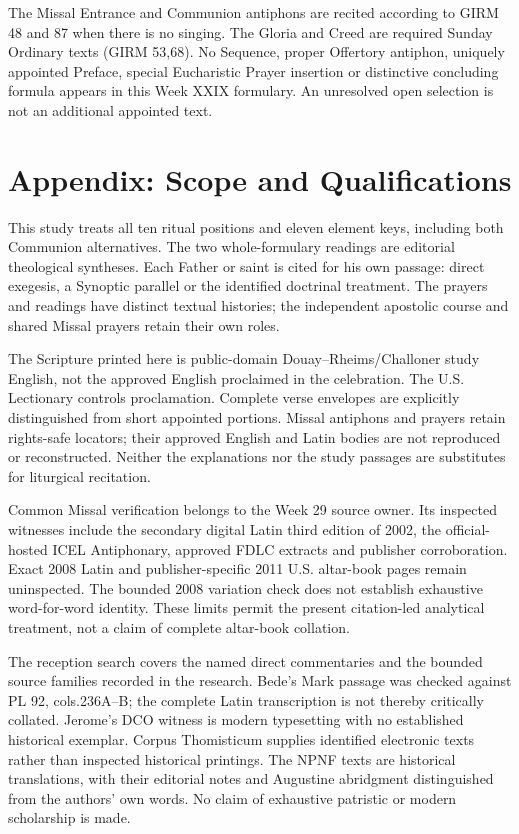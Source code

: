 The Missal Entrance and Communion antiphons are recited according to GIRM 48 and 87 when there is no singing. The Gloria and Creed are required Sunday Ordinary texts (GIRM 53,68). No Sequence, proper Offertory antiphon, uniquely appointed Preface, special Eucharistic Prayer insertion or distinctive concluding formula appears in this Week XXIX formulary. An unresolved open selection is not an additional appointed text.

\section{Appendix: Scope and Qualifications}
This study treats all ten ritual positions and eleven element keys, including both Communion alternatives. The two whole-formulary readings are editorial theological syntheses. Each Father or saint is cited for his own passage: direct exegesis, a Synoptic parallel or the identified doctrinal treatment. The prayers and readings have distinct textual histories; the independent apostolic course and shared Missal prayers retain their own roles.

The Scripture printed here is public-domain Douay--Rheims/Challoner study English, not the approved English proclaimed in the celebration. The U.S. Lectionary controls proclamation. Complete verse envelopes are explicitly distinguished from short appointed portions. Missal antiphons and prayers retain rights-safe locators; their approved English and Latin bodies are not reproduced or reconstructed. Neither the explanations nor the study passages are substitutes for liturgical recitation.

Common Missal verification belongs to the Week 29 source owner. Its inspected witnesses include the secondary digital Latin third edition of 2002, the official-hosted ICEL Antiphonary, approved FDLC extracts and publisher corroboration. Exact 2008 Latin and publisher-specific 2011 U.S. altar-book pages remain uninspected. The bounded 2008 variation check does not establish exhaustive word-for-word identity. These limits permit the present citation-led analytical treatment, not a claim of complete altar-book collation.

The reception search covers the named direct commentaries and the bounded source families recorded in the research. Bede's Mark passage was checked against PL 92, cols.236A--B; the complete Latin transcription is not thereby critically collated. Jerome's DCO witness is modern typesetting with no established historical exemplar. Corpus Thomisticum supplies identified electronic texts rather than inspected historical printings. The NPNF texts are historical translations, with their editorial notes and Augustine abridgment distinguished from the authors' own words. No claim of exhaustive patristic or modern scholarship is made.

